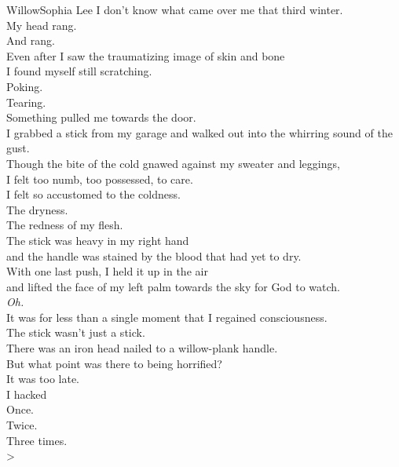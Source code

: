 \begin{poetry}{Willow}{Sophia Lee}
    I don't know what came over me that third winter.\\
    My head rang.\\
    And rang.\\
    Even after I saw the traumatizing image of skin and bone\\
    I found myself still scratching.\\
    Poking.\\
    Tearing.\\
    Something pulled me towards the door.\\
    I grabbed a stick from my garage and walked out into the whirring sound of the gust.\\
    Though the bite of the cold gnawed against my sweater and leggings,\\
    I felt too numb, too possessed, to care.\\
    I felt so accustomed to the coldness.\\
    The dryness.\\
    The redness of my flesh.\\
    The stick was heavy in my right hand\\
    and the handle was stained by the blood that had yet to dry.\\
    With one last push, I held it up in the air\\
    and lifted the face of my left palm towards the sky for God to watch.\\
    \tab{}\textit{Oh.}\\
    It was for less than a single moment that I regained consciousness.\\
    The stick wasn't just a stick.\\
    There was an iron head nailed to a willow-plank handle.\\
    But what point was there to being horrified?\\
    It was too late.\\
    I hacked\\
    \tab{}Once.\\
    \tab{}\tab{}Twice.\\
    \tab{}\tab{}\tab{}Three times.\\>
    

\end{poetry}
